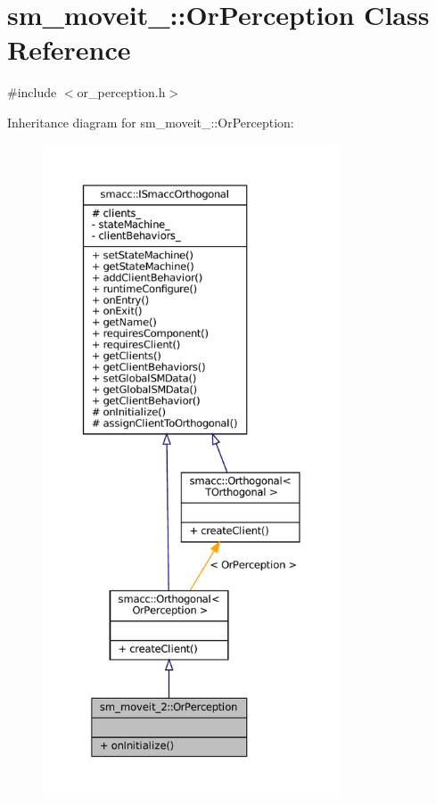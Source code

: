 \hypertarget{classsm__moveit__2_1_1OrPerception}{}\section{sm\+\_\+moveit\+\_\+:\+:Or\+Perception Class Reference}
\label{classsm__moveit__2_1_1OrPerception}


{\ttfamily \#include $<$or\+\_\+perception.\+h$>$}



Inheritance diagram for sm\+\_\+moveit\+\_\+:\+:Or\+Perception\+:
\nopagebreak
\begin{figure}[H]
\begin{center}
\leavevmode
\includegraphics[height=550pt]{classsm__moveit__2_1_1OrPerception__inherit__graph}
\end{center}
\end{figure}


